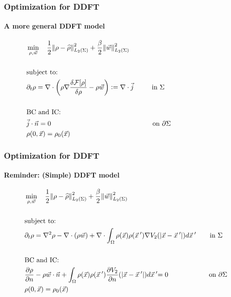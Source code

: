 \documentclass[aspectratio=169,xcolor=dvipsnames]{beamer}
\begin{document}
\begin{frame}
	\frametitle{Optimization for DDFT}
	\framesubtitle{A more general DDFT model}
	\begin{align*}
		&\min_{\rho,\vec{w}} \quad \frac{1}{2}\norm{\rho- \widehat{\rho}}_{L_2(\Sigma)}^2 + \frac{\beta}{2} \norm{ {\vec{w}}}_{L_2(\Sigma)}^2\\
		\\
		&\text{subject to:}
		\\
		& \partial_t \rho = \nabla \cdot \left( \rho \nabla \frac{\delta \mathcal F [\rho]}{\delta \rho} - \rho  {\vec{w}}\right):= \nabla \cdot \vec j \qquad \ \ { \text{in    } \Sigma}\qquad\qquad\qquad\qquad\\
		\\
		&{\text{BC } \text{and IC:}}\\
		&\vec j \cdot \vec n = 0 \qquad \ \ \ \qquad \qquad\qquad\qquad\qquad\qquad \text{on   } \partial \Sigma   \qquad\qquad\qquad\qquad\\
		&{\rho(0,\vec{x}) = \rho_0(\vec{x})} 
	\end{align*}
	
\end{frame}
\begin{frame}
	\frametitle{Optimization for DDFT}
	\framesubtitle{Reminder: (Simple) DDFT model}
	\begin{align*}
		&\min_{\rho,\vec{w}} \quad \frac{1}{2}\norm{\rho- \widehat{\rho}}_{L_2(\Sigma)}^2 + \frac{\beta}{2} \norm{ {\vec{w}}}_{L_2(\Sigma)}^2\\
		\\
		&\text{subject to:}
		\\
		& \partial_t \rho = \nabla^2 \rho - \nabla \cdot (\rho  {\vec{w}})+ {\nabla \cdot \int_\Omega \rho(\vec{x}) \rho(\vec{x}\hspace{0.2em}') \nabla V_2(|\vec{x}-\vec{x}\hspace{0.2em}'|)d\vec{x}\hspace{0.2em}'} \qquad { \text{in    } \Sigma}\\
		\\
		&{\text{BC } \text{and IC:}}\\
		&\frac{\partial \rho}{\partial n} - \rho  {\vec{w}} \cdot \vec{n} + { \int_\Omega \rho(\vec{x}) \rho(\vec{x}\hspace{0.2em}')  \frac{ \partial  V_2}{\partial n}(|\vec{x}-\vec{x}\hspace{0.2em}'|)d\vec{x}\hspace{0.2em}'} {= 0 \quad \ \ \ \qquad \qquad \text{on   } \partial \Sigma  } \\
		&{\rho(0,\vec{x}) = \rho_0(\vec{x})} 
	\end{align*}
	
\end{frame}
\end{document}
